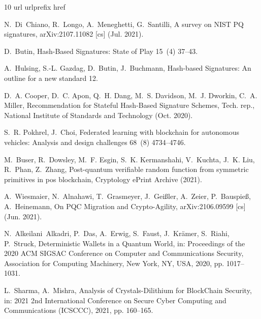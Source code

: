 \documentclass[5p,times]{elsarticle}
\theoremstyle{definition}
\theoremstyle{remark}
\numberwithin{equation}{section}
\begin{document}
 \begin{thebibliography}{10}
\expandafter\ifx\csname url\endcsname\relax
  \def\url#1{\texttt{#1}}\fi
\expandafter\ifx\csname urlprefix\endcsname\relax\def\urlprefix{URL }\fi
\expandafter\ifx\csname href\endcsname\relax
  \def\href#1#2{#2} \def\path#1{#1}\fi

N.~Di~Chiano, R.~Longo, A.~Meneghetti, G.~Santilli, A survey on {{NIST PQ}}
  signatures, arXiv:2107.11082 [cs] (Jul. 2021).


D.~Butin, Hash-{{Based Signatures}}: {{State}} of {{Play}} 15~(4)  37--43.


A.~Hulsing, S.-L. Gazdag, D.~Butin, J.~Buchmann, Hash-based {{Signatures}}:
  {{An}} outline for a new standard  12.

D.~A. Cooper, D.~C. Apon, Q.~H. Dang, M.~S. Davidson, M.~J. Dworkin, C.~A.
  Miller, Recommendation for {{Stateful Hash-Based Signature Schemes}}, Tech.
  rep., {National Institute of Standards and Technology} (Oct. 2020).


S.~R. Pokhrel, J.~Choi, Federated learning with blockchain for autonomous
  vehicles: Analysis and design challenges 68~(8)  4734--4746.


M.~Buser, R.~Dowsley, M.~F. Esgin, S.~K. Kermanshahi, V.~Kuchta, J.~K. Liu,
  R.~Phan, Z.~Zhang, Post-quantum verifiable random function from symmetric
  primitives in pos blockchain, Cryptology ePrint Archive (2021).

A.~Wiesmaier, N.~Alnahawi, T.~Grasmeyer, J.~Gei{\ss}ler, A.~Zeier,
  P.~Bauspie{\ss}, A.~Heinemann, On {{PQC Migration}} and {{Crypto-Agility}},
  arXiv:2106.09599 [cs] (Jun. 2021).


N.~Alkeilani~Alkadri, P.~Das, A.~Erwig, S.~Faust, J.~Kr{\"a}mer, S.~Riahi,
  P.~Struck, Deterministic {{Wallets}} in a {{Quantum World}}, in: Proceedings
  of the 2020 {{ACM SIGSAC Conference}} on {{Computer}} and {{Communications
  Security}}, {Association for Computing Machinery}, {New York, NY, USA}, 2020,
  pp. 1017--1031.

L.~Sharma, A.~Mishra, Analysis of {{Crystals-Dilithium}} for {{BlockChain
  Security}}, in: 2021 2nd {{International Conference}} on {{Secure Cyber
  Computing}} and {{Communications}} ({{ICSCCC}}), 2021, pp. 160--165.



\end{thebibliography}
\end{document}

